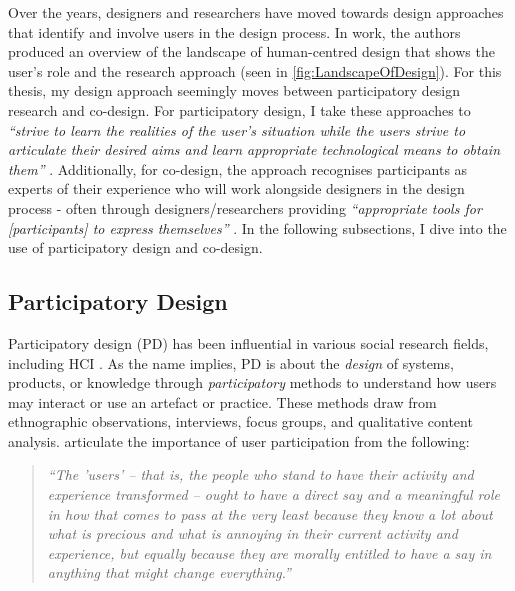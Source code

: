 Over the years, designers and researchers have moved towards design approaches that identify and involve users in the design process. In \cite{sanders2008co} work, the authors produced an overview of the landscape of human-centred design that shows the user's role and the research approach (seen in \ref{fig:LandscapeOfDesign}). For this thesis, my design approach seemingly moves between participatory design research and co-design. For participatory design, I take these approaches to \textit{``strive to learn the realities of the user's situation while the users strive to articulate their desired aims and learn appropriate technological means to obtain them''} \citep{simonsen2013routledge}. Additionally, for co-design, the approach recognises participants as experts of their experience who will work alongside designers in the design process - often through designers/researchers providing \textit{``appropriate tools for [participants] to express themselves''} \citep{sanders2008co}. In the following subsections, I dive into the use of participatory design and co-design.

\subsection{Participatory Design}
\label{Method:PD}
Participatory design (PD) has been influential in various social research fields, including HCI \citep{bannon2018introduction}. As the name implies, PD is about the \textit{design} of systems, products, or knowledge through \textit{participatory} methods to understand how users may interact or use an artefact or practice. These methods draw from ethnographic observations, interviews, focus groups, and qualitative content analysis. \cite{carroll2007participatory} articulate the importance of user participation from the following:

\begin{quote}
\textit{``The 'users' – that is, the people who stand to have their activity and experience transformed – ought to have a direct say and a meaningful role in how that comes to pass at the very least because they know a lot about what is precious and what is annoying in their current activity and experience, but equally because they are morally entitled to have a say in anything that might change everything.'' \citep{carroll2007participatory}    
}\end{quote}

